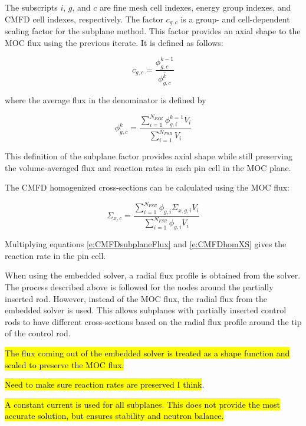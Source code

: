 The subscripts $i$, $g$, and $c$ are fine mesh cell indexes, energy group indexes, and CMFD cell indexes, respectively.  The factor $c_{g,c}$ is a group- and cell-dependent scaling factor for the subplane method.  This factor provides an axial shape to the MOC flux using the previous iterate.  It is defined as follows:

\begin{equation}\label{e:CMFDsubplaneFactor}
c_{g,c} = \frac{\phi^{k-1}_{g,c}}{\overline{\phi^k_{g,c}}}
\end{equation}

where the average flux in the denominator is defined by

\begin{equation}\label{e:CMFDaverageFlux}
\phi^k_{g,c} = \frac{\sum_{i=1}^{N_{FSR}} \phi^{k=1}_{g,i} V_i}{\sum_{i=1}^{N_{FSR}} V_i}
\end{equation}

This definition of the subplane factor provides axial shape while still preserving the volume-averaged flux and reaction rates in each pin cell in the MOC plane.

The CMFD homogenized cross-sections can be calculated using the MOC flux:

\begin{equation}\label{e:CMFDhomXS}
\Sigma_{x,c} = \frac{\sum_{i=1}^{N_{FSR}} \phi_{g,i}\Sigma_{x,g,i}V_i}{\sum_{i=1}^{N_{FSR}} \phi_{g,i}V_i}
\end{equation}

Multiplying equations \ref{e:CMFDsubplaneFlux} and \ref{e:CMFDhomXS} gives the reaction rate in the pin cell.

When using the embedded solver, a radial flux profile is obtained from the solver.  The process described above is followed for the nodes around the partially inserted rod.  However, instead of the MOC flux, the radial flux from the embedded solver is used.  This allows subplanes with partially inserted control rods to have different cross-sections based on the radial flux profile around the tip of the control rod.

\hl{The flux coming out of the embedded solver is treated as a shape function and scaled to preserve the MOC flux.}

\hl{Need to make sure reaction rates are preserved I think}.

\hl{A constant current is used for all subplanes.  This does not provide the most accurate solution, but ensures stability and neutron balance.}

